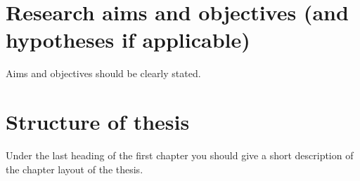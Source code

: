 \section{Research aims and objectives (and hypotheses if applicable)}
\label{sec:aims}
Aims and objectives should be clearly stated. 

\section{Structure of thesis}
\label{sec:structure}
Under the last heading of the first chapter you should give a short description of the chapter layout of the thesis.

